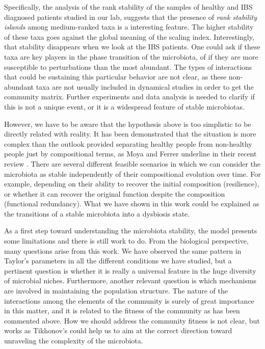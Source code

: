 Specifically, the analysis of the rank stability of the samples of healthy and IBS diagnosed patients studied in our lab\cite{IBS}, suggests that the presence of \emph{rank stability islands} among medium-ranked taxa is a interesting feature. The higher stability of these taxa goes against the global meaning of the scaling index. Interestingly, that stability disappears when we look at the IBS patients. One could ask if these taxa are key players in the phase transition of the microbiota, of if they are more susceptible to perturbations than the most abundant. The types of interactions that could be sustaining this particular behavior are not clear, as these non-abundant taxa are not usually included in dynamical studies in order to get the community matrix. Further experiments and data analysis is needed to clarify if this is not a unique event, or it is a widespread feature of stable microbiotas. 

However, we have to be aware that the hypothesis above is too simplistic to be directly related with reality. It has been demonstrated that the situation is more complex than the outlook provided separating healthy people from non-healthy people just by compositional terms, as Moya and Ferrer underline in their recent review \cite{Moya_trends}. There are several different feasible scenarios in which we can consider the microbiota as stable independently of their compositional evolution over time. For example, depending on their ability to recover the initial composition (resilience), or whether it can recover the original function despite the composition (functional redundancy). What we have shown in this work could be explained as the transitions of a stable microbiota into a dysbiosis state.  

As a first step toward understanding the microbiota stability, the model presents some limitations and there is still work to do. From the biological perspective, many questions arise from this work. We have observed the same pattern in Taylor's parameters in all the different conditions we have studied, but a pertinent question is whether it is really a universal feature in the huge diversity of microbial niches. Furthermore, another relevant question is which mechanisms are involved in maintaining the population structure. The nature of the interactions among the elements of the community is surely of great importance in this matter, and it is related to the fitness of the community as has been commented above. How we should address the community fitness is not clear, but works as Tikhonov's \cite{tikhonov} could help us to aim at the correct direction toward unraveling the complexity of the microbiota.